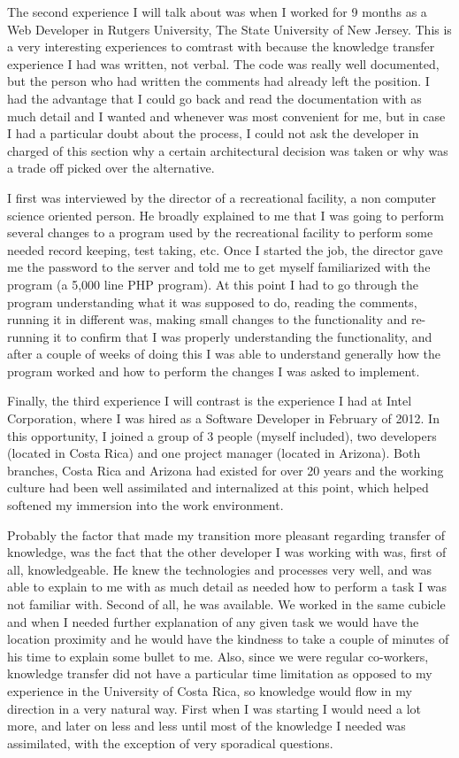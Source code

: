 \documentclass[12pt, letterpaper]{article}
\begin{document}
The second experience I will talk about was when I worked for 9 months as a Web Developer in Rutgers University, The
State University of New Jersey. This is a very interesting experiences to comtrast with because the knowledge 
transfer experience I had was written, not verbal. The code was really well documented, but the person who had 
written the comments had already left the position. I had the advantage that I could go back and read the 
documentation with as much detail and I wanted and whenever was most convenient for me, but in case I had a
particular doubt about the process, I could not ask the developer in charged of this section why a certain
architectural decision was taken or why was a trade off picked over the alternative.

I first was interviewed by the director of a recreational facility, a non computer science oriented person. He broadly 
explained to me that I was going to 
perform several changes to a program used by the recreational facility to perform some needed record keeping,
test taking, etc. Once I started the job, the director gave me the password to the server and told me to 
get myself familiarized with the program (a 5,000 line PHP program). At this point I had to go through
the program understanding what it was supposed to do, reading the comments, running it in different was, making small 
changes to the 
functionality and re-running it to confirm that I was properly understanding the functionality, and after a couple of 
weeks of doing this I was able to understand generally how the program worked and how to perform the changes I was asked
to implement.

Finally, the third experience I will contrast is the experience I had at Intel Corporation, where I was hired
as a Software Developer in February of 2012. In this opportunity, I joined a group of 3 people (myself included),
two developers (located in Costa Rica) and one project manager (located in Arizona). Both branches, Costa Rica 
and Arizona had existed for over 20 years and the working culture had been well assimilated and internalized
at this point, which helped softened my immersion into the work environment.

Probably the factor that made my transition more pleasant regarding transfer of knowledge, was the fact that 
the other developer I was working with was, first of all, knowledgeable. He knew the technologies and processes
very well, and was able to explain to me with as much detail as needed how to perform a task I was not familiar with. 
Second of all, he was available. We worked in the same cubicle and when I needed further explanation of any given 
task we would have the location proximity and he would have the kindness to take a couple of minutes of his time
to explain some bullet to me. Also, since we were regular co-workers, knowledge transfer did not have a particular
time limitation as opposed to my experience in the University of Costa Rica, so knowledge would flow in my
direction in a very natural way. First when I was starting I would need a lot more, and later on less and less 
until most of the knowledge I needed was assimilated, with the exception of very sporadical questions. 
\end{document}
